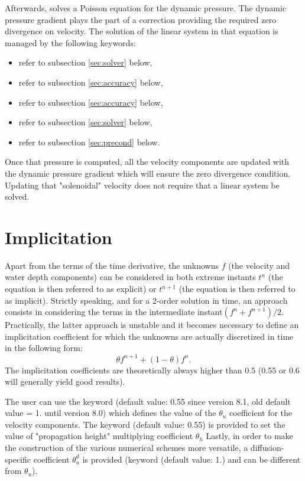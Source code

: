 Afterwards,  solves a Poisson equation for the dynamic pressure. The
dynamic pressure gradient plays the part of a correction providing the required
zero divergence on velocity. The solution of the linear system in that equation
is managed by the following keywords:

\begin{itemize}
\item {} refer to subsection \ref{sec:solver} below,

\item {} refer to subsection \ref{sec:accuracy}
below,

\item {} refer to subsection \ref{sec:accuracy} below,

\item {} refer to subsection \ref{sec:solver} below,

\item {} refer to subsection \ref{sec:precond} below.
\end{itemize}

Once that pressure is computed, all the velocity components are updated with
the dynamic pressure gradient which will ensure the zero divergence condition.
Updating that "solenoidal" velocity does not require that a linear system be
solved.

\section{Implicitation}

Apart from the terms of the time derivative, the unknowns $f$ (the velocity and
water depth components) can be considered in both extreme instants $t^{n}$ (the
equation is then referred to as explicit) or $t^{n+1}$ (the equation is then
referred to as implicit). Strictly speaking, and for a 2-order solution in
time, an approach consists in considering the terms in the intermediate
instant$(f^{n} +f^{n+1})/2$. Practically, the latter approach is unstable and
it becomes necessary to define an implicitation coefficient for which the
unknowns are actually discretized in time in the following form:
\[\theta f^{n+1} +(1-\theta )f^{n} .\]
The implicitation coefficients are theoretically always higher than 0.5 (0.55
or 0.6 will generally yield good results).

The user can use the keyword  (default
value: 0.55 since version 8.1, old default value = 1. until version 8.0)
which defines the value of the $\theta_{u}$ coefficient for the
velocity components. The keyword  (default
value: 0.55) is provided to set the value of "propagation height" multiplying
coefficient $\theta_{h}$ Lastly, in order to make the construction of the
various numerical schemes more versatile, a diffusion-specific coefficient
$\theta_{u}^{d}$ is provided (keyword 
(default value: 1.) and can be different from $\theta_{u}$).


